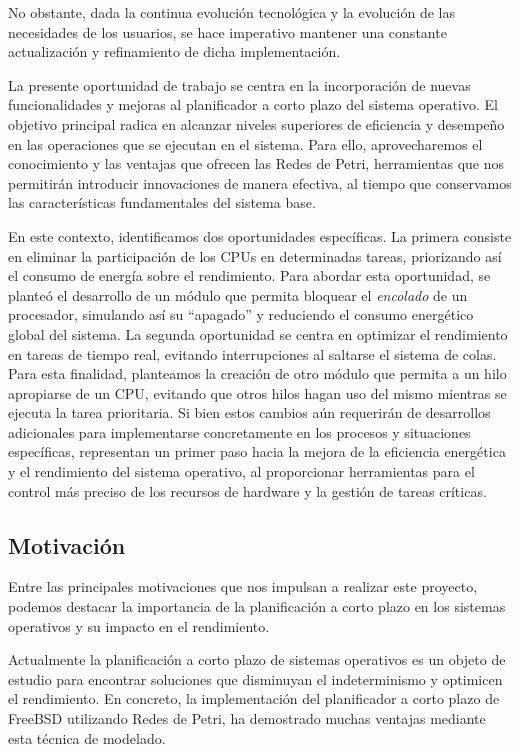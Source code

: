No obstante, dada la continua evolución tecnológica y la evolución de las necesidades de los usuarios, se hace imperativo mantener una constante actualización y refinamiento de dicha implementación.\par

La presente oportunidad de trabajo se centra en la incorporación de nuevas funcionalidades y mejoras al planificador a corto plazo del sistema operativo. El objetivo principal radica en alcanzar niveles superiores de eficiencia y desempeño en las operaciones que se ejecutan en el sistema. Para ello, aprovecharemos el conocimiento y las ventajas que ofrecen las Redes de Petri, herramientas que nos permitirán introducir innovaciones de manera efectiva, al tiempo que conservamos las características fundamentales del sistema base.\par

En este contexto, identificamos dos oportunidades específicas. La primera consiste en eliminar la participación de los CPUs en determinadas tareas, priorizando así el consumo de energía sobre el rendimiento. Para abordar esta oportunidad, se planteó el desarrollo de un módulo que permita bloquear el \textit{encolado} de un procesador, simulando así su ``apagado'' y reduciendo el consumo energético global del sistema. La segunda oportunidad se centra en optimizar el rendimiento en tareas de tiempo real, evitando interrupciones al saltarse el sistema de colas. Para esta finalidad, planteamos la creación de otro módulo que permita a un hilo apropiarse de un CPU, evitando que otros hilos hagan uso del mismo mientras se ejecuta la tarea prioritaria. Si bien estos cambios aún requerirán de desarrollos adicionales para implementarse concretamente en los procesos y situaciones específicas, representan un primer paso hacia la mejora de la eficiencia energética y el rendimiento del sistema operativo, al proporcionar herramientas para el control más preciso de los recursos de hardware y la gestión de tareas críticas.\par

\subsection{Motivación}
Entre las principales motivaciones que nos impulsan a realizar este proyecto, podemos destacar la importancia de la planificación a corto plazo en los sistemas operativos y su impacto en el rendimiento.

Actualmente la planificación a corto plazo de sistemas operativos es un objeto de estudio para encontrar soluciones que disminuyan el indeterminismo y optimicen el rendimiento. En concreto, la implementación del planificador a corto plazo de FreeBSD utilizando Redes de Petri, ha demostrado muchas ventajas mediante esta técnica de modelado.\par

